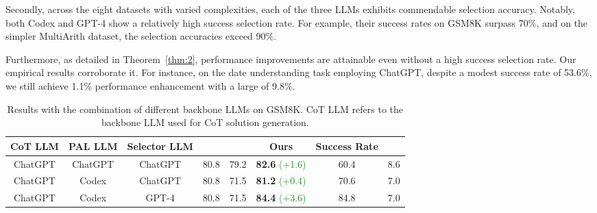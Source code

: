 \documentclass[11pt]{article}
\begin{document}
Secondly, across the eight datasets with varied complexities, each of the three LLMs exhibits commendable selection accuracy. Notably, both Codex and GPT-4 show a relatively high success selection rate. For example, their success rates on GSM8K surpass 70\%, and on the simpler MultiArith dataset, the selection accuracies exceed 90\%. 

Furthermore, as detailed in Theorem~\ref{thm:2}, performance improvements are attainable even without a high success selection rate. Our empirical results corroborate it. For instance, on the date understanding task employing ChatGPT, despite a modest success rate of 53.6\%, we still achieve 1.1\% performance enhancement with a large  of 9.8\%. 

\begin{table*}[ht]
    \centering
    \small
    \begin{tabular}{cccccccc}
    \toprule
    CoT LLM & PAL LLM & Selector LLM &  &  & Ours & Success Rate &  \\
     \midrule
      ChatGPT & ChatGPT & ChatGPT & 80.8 & 79.2 & \textbf{82.6} \textcolor{ForestGreen}{(+1.6)} & 60.4 & 8.6\\
     ChatGPT & Codex & ChatGPT & 80.8 & 71.5  & \textbf{81.2}  \textcolor{ForestGreen}{(+0.4)} & 70.6 & 7.0\\
     ChatGPT & Codex  & GPT-4 & 80.8 & 71.5 & \textbf{84.4} \textcolor{ForestGreen}{(+3.6)} & 84.8 & 7.0 \\
     \bottomrule
    \end{tabular}
    \caption{Results with the combination of different backbone LLMs on GSM8K. CoT LLM refers to the backbone LLM used for CoT solution generation.}
    \label{tab:different_backbones}
\end{table*}
\end{document}
